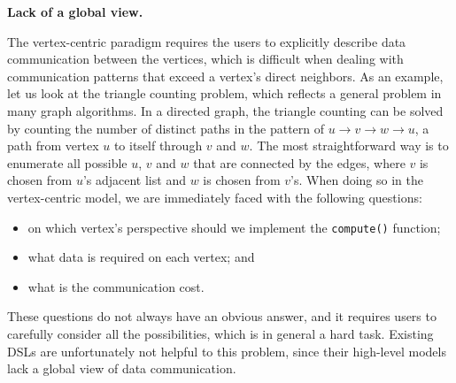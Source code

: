 \documentclass{sokendai_thesis} %
\begin{document}

\textbf{Lack of a global view.}

The vertex-centric paradigm requires the users to explicitly describe data communication between the vertices, which is difficult when dealing with communication patterns that exceed a vertex's direct neighbors.
As an example, let us look at the triangle counting problem, which reflects a general problem in many graph algorithms.
In a directed graph, the triangle counting can be solved by counting the number of distinct paths in the pattern of $u\rightarrow v\rightarrow w\rightarrow u$, a path from vertex $u$ to itself through $v$ and $w$.
The most straightforward way is to enumerate all possible $u$, $v$ and $w$ that are connected by the edges, where $v$ is chosen from $u$'s adjacent list and $w$ is chosen from $v$'s.
When doing so in the vertex-centric model, we are immediately faced with the following questions:
\begin{itemize}
\item on which vertex's perspective should we implement the \texttt{compute()} function;
\item what data is required on each vertex; and
\item what is the communication cost.
\end{itemize}
These questions do not always have an obvious answer, and it requires users to carefully consider all the possibilities, which is in general a hard task.
Existing DSLs are unfortunately not helpful to this problem, since their high-level models lack a global view of data communication.
\end{document}
